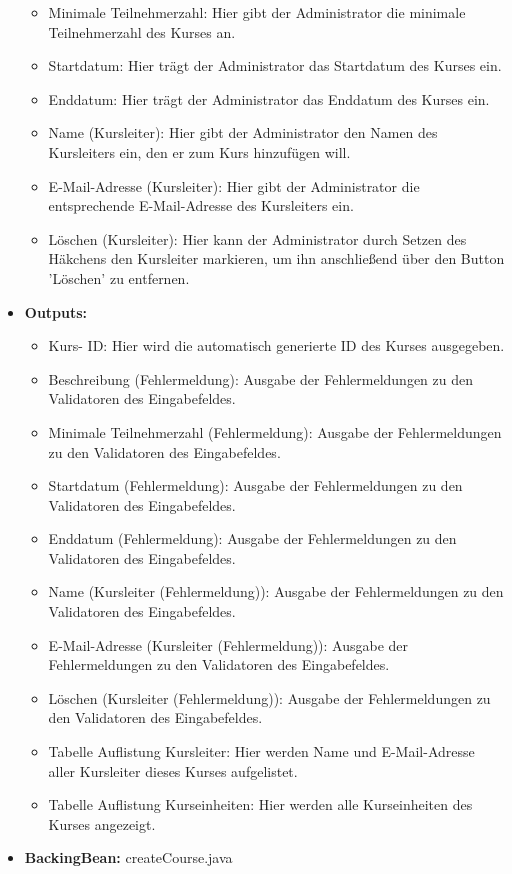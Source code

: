 \begin{itemize}
\begin{itemize}
								\item Minimale Teilnehmerzahl: Hier gibt der Administrator die minimale Teilnehmerzahl des Kurses an.
								\item Startdatum: Hier trägt der Administrator das Startdatum des Kurses ein.
								\item Enddatum: Hier trägt der Administrator das Enddatum des Kurses ein.
								\item Name (Kursleiter): Hier gibt der Administrator den Namen des Kursleiters ein, den er zum Kurs hinzufügen will.
								\item E-Mail-Adresse (Kursleiter): Hier gibt der Administrator die entsprechende E-Mail-Adresse des Kursleiters ein.
								\item Löschen (Kursleiter): Hier kann der Administrator durch Setzen des Häkchens den Kursleiter markieren, um ihn anschließend über den Button 'Löschen' zu entfernen.
							\end{itemize}
						\item \textbf{Outputs:}
							\begin{itemize}
								\item Kurs- ID: Hier wird die automatisch generierte ID des Kurses ausgegeben.
								\item Beschreibung (Fehlermeldung): Ausgabe der Fehlermeldungen zu den Validatoren des Eingabefeldes.
								\item Minimale Teilnehmerzahl (Fehlermeldung): Ausgabe der Fehlermeldungen zu den Validatoren des Eingabefeldes.
								\item Startdatum (Fehlermeldung): Ausgabe der Fehlermeldungen zu den Validatoren des Eingabefeldes.
								\item Enddatum (Fehlermeldung): Ausgabe der Fehlermeldungen zu den Validatoren des Eingabefeldes.
								\item Name (Kursleiter (Fehlermeldung)): Ausgabe der Fehlermeldungen zu den Validatoren des Eingabefeldes.
								\item E-Mail-Adresse (Kursleiter (Fehlermeldung)): Ausgabe der Fehlermeldungen zu den Validatoren des Eingabefeldes.
								\item Löschen (Kursleiter (Fehlermeldung)): Ausgabe der Fehlermeldungen zu den Validatoren des Eingabefeldes.
								\item Tabelle Auflistung Kursleiter: Hier werden Name und E-Mail-Adresse aller Kursleiter dieses Kurses aufgelistet.
								\item Tabelle Auflistung Kurseinheiten: Hier werden alle Kurseinheiten des Kurses angezeigt.
							\end{itemize}
						\item \textbf{BackingBean:} createCourse.java
					\end{itemize}
				
